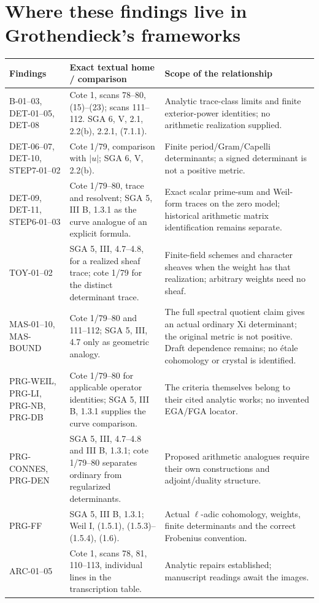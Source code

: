 \documentclass[11pt,a4paper]{article}
\begin{document}
\section{Where these findings live in Grothendieck's frameworks}
\begin{longtable}{>{\raggedright\arraybackslash}p{}>{\raggedright\arraybackslash}p{}>{\raggedright\arraybackslash}p{}}
\toprule
Findings & Exact textual home / comparison & Scope of the relationship\\\midrule\endhead
B-01--03, DET-01--05, DET-08 & Cote 1, scans 78--80, (15)--(23); scans 111--112. SGA 6, V, 2.1, 2.2(b), 2.2.1, (7.1.1). & Analytic trace-class limits and finite exterior-power identities; no arithmetic realization supplied.\\
DET-06--07, DET-10, STEP7-01--02 & Cote 1/79, comparison with $|u|$; SGA 6, V, 2.2(b). & Finite period/Gram/Capelli determinants; a signed determinant is not a positive metric.\\
DET-09, DET-11, STEP6-01--03 & Cote 1/79--80, trace and resolvent; SGA 5, III B, 1.3.1 as the curve analogue of an explicit formula. & Exact scalar prime-sum and Weil-form traces on the zero model; historical arithmetic matrix identification remains separate.\\
TOY-01--02 & SGA 5, III, 4.7--4.8, for a realized sheaf trace; cote 1/79 for the distinct determinant trace. & Finite-field schemes and character sheaves when the weight has that realization; arbitrary weights need no sheaf.\\
MAS-01--10, MAS-BOUND & Cote 1/79--80 and 111--112; SGA 5, III, 4.7 only as geometric analogy. & The full spectral quotient claim gives an actual ordinary Xi determinant; the original metric is not positive. Draft dependence remains; no \'etale cohomology or crystal is identified.\\
PRG-WEIL, PRG-LI, PRG-NB, PRG-DB & Cote 1/79--80 for applicable operator identities; SGA 5, III B, 1.3.1 supplies the curve comparison. & The criteria themselves belong to their cited analytic works; no invented EGA/FGA locator.\\
PRG-CONNES, PRG-DEN & SGA 5, III, 4.7--4.8 and III B, 1.3.1; cote 1/79--80 separates ordinary from regularized determinants. & Proposed arithmetic analogues require their own constructions and adjoint/duality structure.\\
PRG-FF & SGA 5, III B, 1.3.1; Weil I, (1.5.1), (1.5.3)--(1.5.4), (1.6). & Actual $\ell$-adic cohomology, weights, finite determinants and the correct Frobenius convention.\\
ARC-01--05 & Cote 1, scans 78, 81, 110--113, individual lines in the transcription table. & Analytic repairs established; manuscript readings await the images.\\\bottomrule
\end{longtable}
\end{document}
